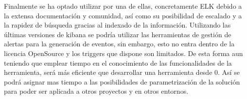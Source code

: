 Finalmente se ha optado utilizar por una de ellas, concretamente ELK debido a la extensa documentación y comunidad, así como su posibilidad de escalado y a la rapidez de búsqueda gracias al indexado de la información. Utilizando las últimas versiones de kibana se podría utilizar las herramientas de gestión de alertas para la generación de eventos, sin embargo, esto no entra dentro de la licencia OpenSource y los triggers que dispone son limitados. De esta forma aun teniendo que emplear tiempo en el conocimiento de las funcionalidades de la herramienta, será más eficiente que desarrollar una herramienta desde 0. Así se podrá asignar mas tiempo a las posibilidades de parametrización de la solución para poder ser aplicada a otros proyectos y en otros entornos.
